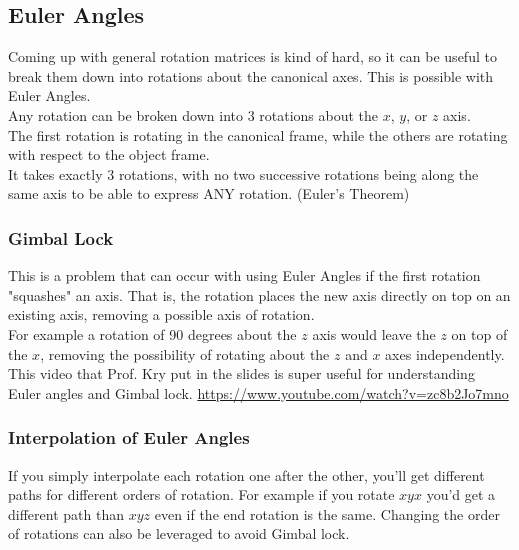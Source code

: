 \documentclass[12pt]{article}
\theoremstyle{definition}
\begin{document}
\subsection{Euler Angles}
Coming up with general rotation matrices is kind of hard, so it can be useful to break them down into rotations about the canonical axes. This is possible with Euler Angles.
\\ \linebreak
Any rotation can be broken down into 3 rotations about the $x$, $y$, or $z$ axis.
\\ \linebreak
The first rotation is rotating in the canonical frame, while the others are rotating with respect to the object frame. 
\\ \linebreak
It takes exactly 3 rotations, with no two successive rotations being along the same axis to be able to express ANY rotation. (Euler's Theorem)
\\ \linebreak
\subsubsection{Gimbal Lock}
This is a problem that can occur with using Euler Angles if the first rotation "squashes" an axis. That is, the rotation places the new axis directly on top on an existing axis, removing a possible axis of rotation. 
\\ \linebreak
For example a rotation of 90 degrees about the $z$ axis would leave the $z$ on top of the $x$, removing the possibility of rotating about the $z$ and $x$ axes independently.
\\ \linebreak
This video that Prof. Kry put in the slides is super useful for understanding Euler angles and Gimbal lock. \url{https://www.youtube.com/watch?v=zc8b2Jo7mno}

\subsubsection{Interpolation of Euler Angles}
If you simply interpolate each rotation one after the other, you'll get different paths for different orders of rotation. For example if you rotate $xyx$ you'd get a different path than $xyz$ even if the end rotation is the same. Changing the order of rotations can also be leveraged to avoid Gimbal lock.
\end{document}
